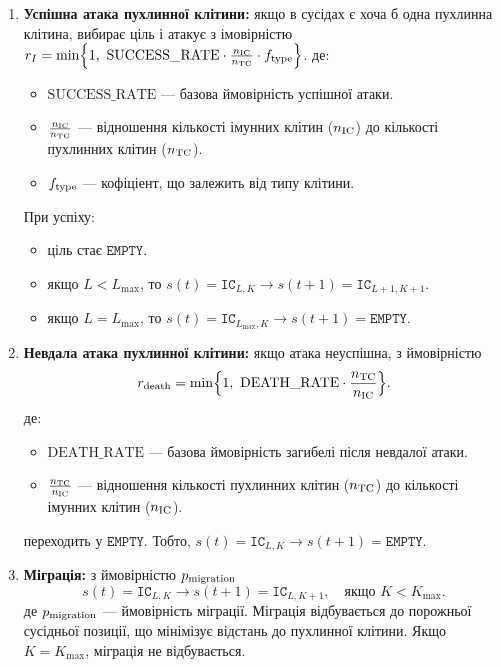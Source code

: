 \documentclass[12pt]{article}
\begin{document}
\begin{itemize}
\begin{enumerate}
       \item \textbf{Успішна атака пухлинної клітини:} якщо в сусідах є хоча б одна пухлинна клітина, вибирає ціль і атакує з імовірністю $r_I = \min\Bigl\{1,\ \text{SUCCESS\_RATE}\cdot\frac{n_{\rm IC}}{n_{\rm TC}}\cdot f_{\rm type}\Bigr\}$.
        де:
        \begin{itemize}
        \item $\text{SUCCESS\_RATE}$ — базова ймовірність успішної атаки.
        \item $\frac{n_{\rm IC}}{n_{\rm TC}}$ — відношення кількості імунних клітин ($n_{\rm IC}$) до кількості пухлинних клітин ($n_{\rm TC}$).
        \item $f_{\rm type}$ — кофіціент, що залежить від типу клітини.
      \end{itemize}
       При успіху:
      \begin{itemize}
        \item ціль стає $\mathtt{EMPTY}$.
        \item якщо $L < L_{\max}$, то $s(t) = \mathtt{IC}_{L,K} \to s(t+1) = \mathtt{IC}_{L+1, K+1}$.
        \item якщо $L = L_{\max}$, то $s(t) = \mathtt{IC}_{L_{\max}, K} \to s(t+1) = \mathtt{EMPTY}$.
        \end{itemize}
       \item \textbf{Невдала атака пухлинної клітини:} якщо атака неуспішна, з ймовірністю
      \[
        r_{\rm death} = \min\Bigl\{1,\ \text{DEATH\_RATE} \cdot \frac{n_{\rm TC}}{n_{\rm IC}}\Bigr\}.
      \]
      де:
      \begin{itemize}
        \item $\text{DEATH\_RATE}$ — базова ймовірність загибелі після невдалої атаки.
        \item $\frac{n_{\rm TC}}{n_{\rm IC}}$ — відношення кількості пухлинних клітин ($n_{\rm TC}$) до кількості імунних клітин ($n_{\rm IC}$).
      \end{itemize}
      
      переходить у $\mathtt{EMPTY}$. Тобто, $s(t) = \mathtt{IC}_{L,K} \to s(t+1) = \mathtt{EMPTY}$.
      \item \textbf{Міграція:} з ймовірністю $p_{\rm migration}$
      \[
        s(t) = \mathtt{IC}_{L,K} \to s(t+1) = \mathtt{IC}_{L, K+1}, \quad \text{якщо } K < K_{\max}.
      \]
      де $p_{\rm migration}$ — ймовірність міграції. Міграція відбувається до порожньої сусідньої позиції, що мінімізує відстань до пухлинної клітини. Якщо $K = K_{\max}$, міграція не відбувається.


\end{enumerate}
\end{itemize}
\end{document}
